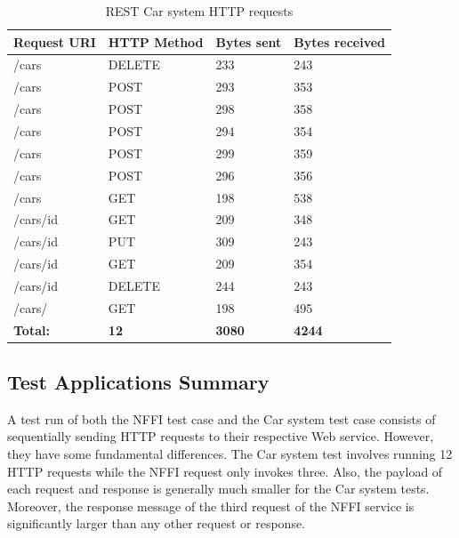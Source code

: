 \begin{table}[h]
\begin{tabular}{|l|l|l|l|}
\hline
\textbf{Request URI} & \textbf{HTTP Method} & \textbf{Bytes sent} & \textbf{Bytes received} \\ \hline
/cars                   & DELETE                  & 233                 & 243           \\ \hline
/cars                   & POST                  & 293                 & 353           \\ \hline
/cars                    & POST                 & 298                 & 358           \\ \hline
/cars                    & POST                 & 294                 & 354           \\ \hline
/cars                    & POST                 & 299                 & 359           \\ \hline
/cars                    & POST                 & 296                 & 356           \\ \hline
/cars                    & GET                 & 198                 & 538           \\ \hline
/cars/{id}                    & GET                 & 209                 & 348           \\ \hline
/cars/{id}                    & PUT                 & 309                 & 243           \\ \hline
/cars/{id}                   & GET                 & 209                 & 354           \\ \hline
/cars/{id}                   & DELETE                 & 244                 & 243           \\ \hline
/cars/                   & GET                 & 198                 & 495           \\ \hline
\textbf{Total:}       & \textbf{12}               & \textbf{3080}                & \textbf{4244}          \\ \hline
\end{tabular}
\caption{REST Car system HTTP requests}
\label{table:car-requests}
\end{table}


\subsection{Test Applications Summary}

A test run of both the NFFI test case and the Car system test case consists of
sequentially sending HTTP requests to their respective Web service. However,
they have some fundamental differences. The Car system test involves running 12
HTTP requests while the NFFI request only invokes three. Also, the payload of
each request and response is generally much smaller for the Car system tests.
Moreover, the response message of the third request of the NFFI service is
significantly larger than any other request or response.


